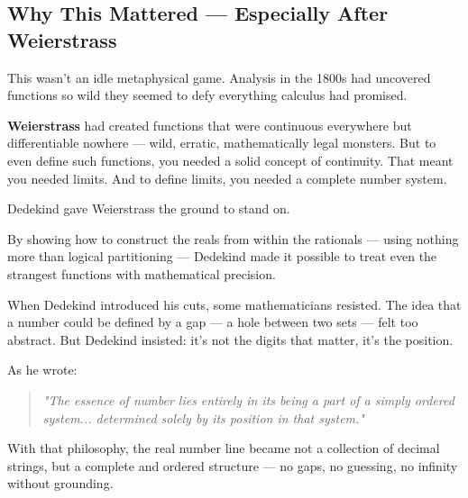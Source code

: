 \subsection{Why This Mattered — Especially After Weierstrass}

This wasn’t an idle metaphysical game. Analysis in the 1800s had uncovered functions so wild they seemed to defy everything calculus had promised.

\textbf{Weierstrass} had created functions that were continuous everywhere but differentiable nowhere — wild, erratic, mathematically legal monsters. But to even define such functions, you needed a solid concept of continuity. That meant you needed limits. And to define limits, you needed a complete number system.

Dedekind gave Weierstrass the ground to stand on.

By showing how to construct the reals from within the rationals — using nothing more than logical partitioning — Dedekind made it possible to treat even the strangest functions with mathematical precision.

\begin{tcolorbox}[colback=gray!5!white, colframe=black!80!white, title={Historical Sidenote: Filling the Gaps with Logic}]
When Dedekind introduced his cuts, some mathematicians resisted. The idea that a number could be defined by a gap — a hole between two sets — felt too abstract. But Dedekind insisted: it’s not the digits that matter, it’s the position.

As he wrote:
\begin{quote}
\textit{"The essence of number lies entirely in its being a part of a simply ordered system... determined solely by its position in that system."}
\end{quote}

With that philosophy, the real number line became not a collection of decimal strings, but a complete and ordered structure — no gaps, no guessing, no infinity without grounding.
\end{tcolorbox}


